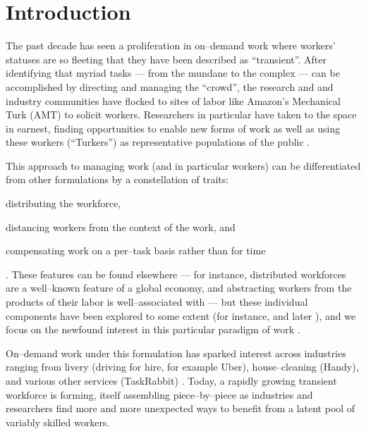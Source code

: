 \documentclass[trackingWork]{subfiles}
\begin{document}
\section{Introduction}
The past decade has seen a proliferation in on--demand work
where workers' statuses are so fleeting that
they have been described as ``transient''.
After identifying that myriad tasks
--- from the mundane to the complex ---
can be accomplished
by directing and managing the ``crowd'',
the research and and industry communities have flocked to sites of labor
like Amazon's Mechanical Turk (AMT)
to solicit workers.
Researchers in particular have taken to the space in earnest,
finding opportunities to enable new forms of work
as well as using these workers (``Turkers'')
as representative populations of the public
\cite{bernsteinSoylent,redballoon,paolacci2010running}.

This approach to managing work (and in particular workers)
can be differentiated from other formulations by a constellation of traits:
\begin{inlinelist}
\item distributing the workforce,
\item distancing workers from the context of the work, and
\item compensating work on a per--task basis rather than for time
\end{inlinelist}.
These features can be found elsewhere
--- for instance,
distributed workforces
are a well--known feature of a global economy,
%
and abstracting workers from the products of their labor
is well--associated with
\citeauthor{marx2012economic} ---
but these individual components have been explored to some extent
(for instance, \citeauthor{fevre1986contract} and later \citeauthor{kalleberg2000nonstandard}),
and we focus on the newfound interest in
this particular paradigm of work
\cite{kalleberg2000nonstandard,fevre1986contract,marx2012economic}.

On--demand work under this formulation
has sparked interest across industries ranging from
livery (driving for hire, for example Uber),
house--cleaning (Handy),
and various other services (TaskRabbit)
\cite{uberOfficial,zaarlyOfficial,taskrabbitOfficial}.
Today, a rapidly growing transient workforce is forming,
itself assembling piece--by--piece as industries and researchers find more and more unexpected ways
to benefit from a latent pool of variably skilled workers.
\end{document}
